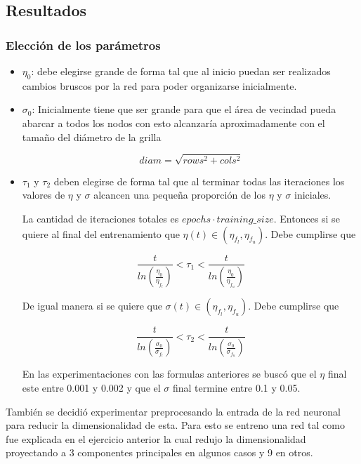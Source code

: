 \clearpage
\subsection{Resultados}
\subsubsection{Elección de los parámetros}
\begin{itemize}
	\item $\eta_0$: debe elegirse grande de forma tal que al inicio puedan ser
	realizados cambios bruscos por la red para poder organizarse inicialmente.

	\item $\sigma_0$: Inicialmente tiene que ser grande para que el área de
	vecindad pueda abarcar a todos los nodos con esto alcanzaría
	aproximadamente con el tamaño del diámetro de la grilla

\[
	diam = \sqrt{rows^2+cols^2}
\]
	\item $\tau_1$ y $\tau_2$ deben elegirse de forma tal que al terminar todas
	las iteraciones los valores de $\eta$ y $\sigma$ alcancen una pequeña
	proporción de los $\eta$ y $\sigma$ iniciales.

	La cantidad de iteraciones totales es $epochs \cdot training\_size $.
	Entonces si se quiere al final del entrenamiento que $\eta(t) \in (\eta_{f_l}, \eta_{f_u})$.
	Debe cumplirse que

	\[ \frac{t}{ln(\frac{\eta_0}{\eta_{f_l}})} < \tau_{1} < \frac{t}{ln(\frac{\eta_0}{\eta_{f_u}})} \]

	De igual manera si se quiere que $\sigma(t) \in (\eta_{f_l}, \eta_{f_u})$.
	Debe cumplirse que

	\[ \frac{t}{ln(\frac{\sigma_0}{\sigma_{f_l}})} < \tau_{2} < \frac{t}{ln(\frac{\sigma_0}{\sigma_{f_u}})} \]

	En las experimentaciones con las formulas anteriores se buscó que el $\eta$
	final este entre 0.001 y 0.002 y que el $\sigma$ final termine entre 0.1 y
	0.05.

\end{itemize}

También se decidió experimentar preprocesando la entrada de la red neuronal
para reducir la dimensionalidad de esta.  Para esto se entreno una red tal como
fue explicada en el ejercicio anterior la cual redujo la dimensionalidad
proyectando a 3 componentes principales en algunos casos y 9 en otros.

